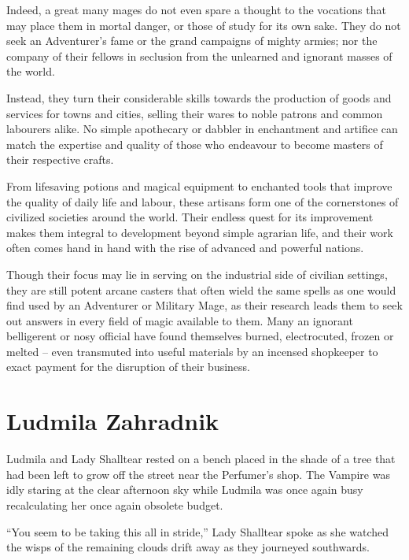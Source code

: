  

Indeed, a great many mages do not even spare a thought to the vocations that may place them in mortal danger, or those of study for its own sake. They do not seek an Adventurer’s fame or the grand campaigns of mighty armies; nor the company of their fellows in seclusion from the unlearned and ignorant masses of the world.

 

Instead, they turn their considerable skills towards the production of goods and services for towns and cities, selling their wares to noble patrons and common labourers alike. No simple apothecary or dabbler in enchantment and artifice can match the expertise and quality of those who endeavour to become masters of their respective crafts.

 

From lifesaving potions and magical equipment to enchanted tools that improve the quality of daily life and labour, these artisans form one of the cornerstones of civilized societies around the world. Their endless quest for its improvement makes them integral to development beyond simple agrarian life, and their work often comes hand in hand with the rise of advanced and powerful nations.

 

Though their focus may lie in serving on the industrial side of civilian settings, they are still potent arcane casters that often wield the same spells as one would find used by an Adventurer or Military Mage, as their research leads them to seek out answers in every field of magic available to them. Many an ignorant belligerent or nosy official have found themselves burned, electrocuted, frozen or melted – even transmuted into useful materials by an incensed shopkeeper to exact payment for the disruption of their business.


\chapter{Ludmila Zahradnik}

Ludmila and Lady Shalltear rested on a bench placed in the shade of a tree that had been left to grow off the street near the Perfumer’s shop. The Vampire was idly staring at the clear afternoon sky while Ludmila was once again busy recalculating her once again obsolete budget.

 

“You seem to be taking this all in stride,” Lady Shalltear spoke as she watched the wisps of the remaining clouds drift away as they journeyed southwards.

